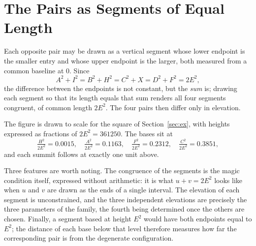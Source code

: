 \documentclass[12pt]{article}
\theoremstyle{remark}
\begin{document}
\section{The Pairs as Segments of Equal Length}

Each opposite pair may be drawn as a vertical segment whose lower
endpoint is the smaller entry and whose upper endpoint is the larger,
both measured from a common baseline at $0$. Since
\[
A^2 + I^2 = B^2 + H^2 = C^2 + X = D^2 + F^2 = 2E^2 ,
\]
the difference between the endpoints is not constant, but the
\emph{sum} is; drawing each segment so that its length equals that sum
renders all four segments congruent, of common length $2E^2$. The four
pairs then differ only in elevation.

\begin{center}
\end{center}

The figure is drawn to scale for the square of
Section~\ref{sec:ex}, with heights expressed as fractions of $2E^2 =
361250$. The bases sit at
\[
\tfrac{H^2}{2E^2} = 0.0015, \quad
\tfrac{A^2}{2E^2} = 0.1163, \quad
\tfrac{F^2}{2E^2} = 0.2312, \quad
\tfrac{C^2}{2E^2} = 0.3851 ,
\]
and each summit follows at exactly one unit above.

Three features are worth noting. The congruence of the segments is the
magic condition itself, expressed without arithmetic: it is what
$u + v = 2E^2$ looks like when $u$ and $v$ are drawn as the ends of a
single interval. The elevation of each segment is unconstrained, and
the three independent elevations are precisely the three parameters of
the family, the fourth being determined once the others are chosen.
Finally, a segment based at height $E^2$ would have both endpoints
equal to $E^2$; the distance of each base below that level therefore
measures how far the corresponding pair is from the degenerate
configuration.
\end{document}
